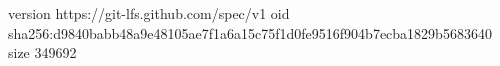version https://git-lfs.github.com/spec/v1
oid sha256:d9840babb48a9e48105ae7f1a6a15c75f1d0fe9516f904b7ecba1829b5683640
size 349692
